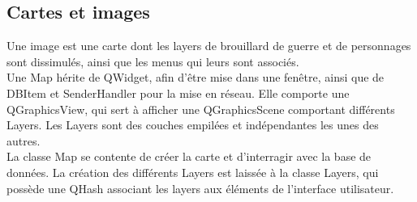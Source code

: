 \subsection{Cartes et images}

Une image est une carte dont les layers de brouillard de guerre et de personnages sont dissimulés, ainsi que les menus qui leurs sont associés.\\
Une Map hérite de QWidget, afin d'être mise dans une fenêtre, ainsi que de DBItem et SenderHandler pour la mise en réseau. Elle comporte une QGraphicsView, qui sert à afficher une QGraphicsScene comportant différents Layers. Les Layers sont des couches empilées et indépendantes les unes des autres.\\
La classe Map se contente de créer la carte et d'interragir avec la base de données. La création des différents Layers est laissée à la classe Layers, qui possède une QHash associant les layers aux éléments de l'interface utilisateur.\\


